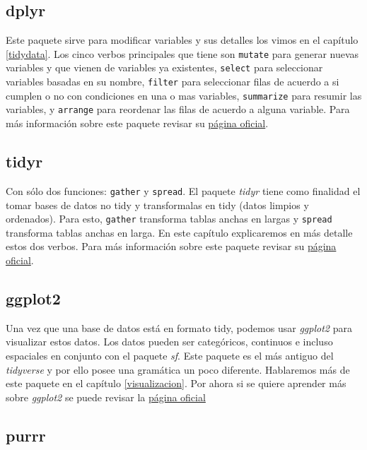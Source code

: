 \documentclass[]{book}
\begin{document}
\hypertarget{dplyr-1}{%
\subsection{dplyr}\label{dplyr-1}}

Este paquete sirve para modificar variables y sus detalles los vimos en
el capítulo \ref{tidydata}. Los cinco verbos principales que tiene son
\texttt{mutate} para generar nuevas variables y que vienen de variables
ya existentes, \texttt{select} para seleccionar variables basadas en su
nombre, \texttt{filter} para seleccionar filas de acuerdo a si cumplen o
no con condiciones en una o mas variables, \texttt{summarize} para
resumir las variables, y \texttt{arrange} para reordenar las filas de
acuerdo a alguna variable. Para más información sobre este paquete
revisar su \href{https://dplyr.tidyverse.org/}{página oficial}.

\hypertarget{tidyr}{%
\subsection{tidyr}\label{tidyr}}

Con sólo dos funciones: \texttt{gather} y \texttt{spread}. El paquete
\emph{tidyr} \citep{Wickhamtidy} tiene como finalidad el tomar bases de
datos no tidy y transformalas en tidy (datos limpios y ordenados). Para
esto, \texttt{gather} transforma tablas anchas en largas y
\texttt{spread} transforma tablas anchas en larga. En este capítulo
explicaremos en más detalle estos dos verbos. Para más información sobre
este paquete revisar su \href{https://tidyr.tidyverse.org/}{página
oficial}.

\hypertarget{ggplot2}{%
\subsection{ggplot2}\label{ggplot2}}

Una vez que una base de datos está en formato tidy, podemos usar
\emph{ggplot2} \citep{Wickhamggplot} para visualizar estos datos. Los
datos pueden ser categóricos, continuos e incluso espaciales en conjunto
con el paquete \emph{sf}. Este paquete es el más antiguo del
\emph{tidyverse} y por ello posee una gramática un poco diferente.
Hablaremos más de este paquete en el capítulo \ref{visualizacion}. Por
ahora si se quiere aprender más sobre \emph{ggplot2} se puede revisar la
\href{https://ggplot2.tidyverse.org/}{página oficial}

\hypertarget{purrr}{%
\subsection{purrr}\label{purrr}}
\end{document}
